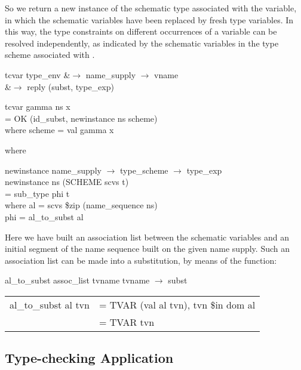 So we return a new instance of the schematic type associated with the
variable, in which the schematic variables have been replaced by fresh type
variables. In this way, the type constraints on different occurrences of a
variable  can be resolved independently, as indicated by the schematic
variables in the type scheme associated with .
\begin{mlalign}
    tcvar \hastype{} type\_env &$\rightarrow$ name\_supply $\rightarrow$ vname \\
    &$\rightarrow$ reply (subst, type\_exp)
\end{mlalign}
\begin{mlcoded}
    tcvar gamma ns x \\
    \phantom{XXXX}= OK (id\_subst, newinstance ns scheme) \\
    \phantom{XXXXXX}where scheme = val gamma x
\end{mlcoded}
where
\begin{mlcoded}
    newinstance \hastype{} name\_supply $\rightarrow$ type\_scheme $\rightarrow$ type\_exp \\
    newinstance ns (SCHEME scvs t) \\
    \phantom{XXXX}= sub\_type phi t \\
    \phantom{XXXXXX}where al  = scvs \$zip (name\_sequence ns) \\
    \phantom{XXXXXXXXXXX}phi = al\_to\_subst al
\end{mlcoded}

Here we have built an association list between the schematic variables and
an initial segment of the name sequence built on the given name supply. Such
an association list can be made into a substitution, by means of the function:
\begin{mlcoded}
    \phantom{n}al\_to\_subst \hastype{} assoc\_list tvname tvname $\rightarrow$ subst \\
    \begin{tabular}{ll}
    al\_to\_subst al tvn &= TVAR (val al tvn),  tvn \$in dom al \\
    &= TVAR tvn
    \end{tabular}
\end{mlcoded}

\subsection{Type-checking Application}

